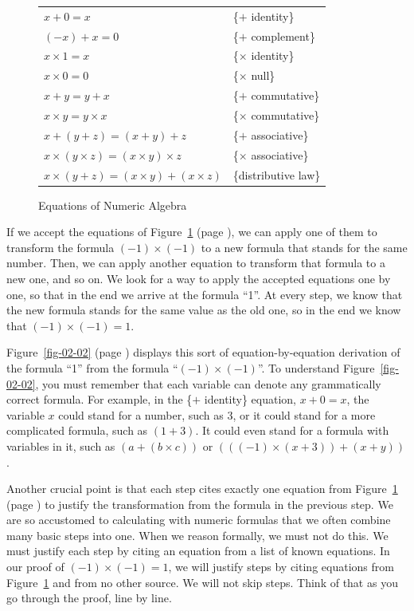 \begin{figure}
\begin{center}
\begin{tabular}{ll}
$x+0 = x$                 & \{$+$ identity\} \\
$(-x)+ x = 0$             & \{$+$ complement\} \\
$x \times 1 = x$          & \{$\times$ identity\} \\
$x \times 0 = 0$          & \{$\times$ null\} \\
$x+y = y+x$               & \{$+$ commutative\} \\
$x \times y = y \times x$ & \{$\times$ commutative\} \\
$x+(y+z) = (x+y)+z$       & \{$+$ associative\} \\
$x \times (y \times z) = (x \times y) \times z$ & \{$\times$ associative\} \\
$x\times(y+z) = (x \times y)+(x \times z)$      & \{distributive law\} \\
\end{tabular}
\end{center}
\caption{Equations of Numeric Algebra}
\label{fig-02-01}
\end{figure}

If we accept the equations of Figure~\ref{fig-02-01} (page \pageref{fig-02-01}),
we can apply one of them to transform the formula $(-1)\times(-1)$ to a new formula that
stands for the same number. Then, we can apply another equation to
transform that formula to a new one, and so on. 
We look for a way to apply the
accepted equations one by one, so that in the end we
arrive at the formula ``1''. At every step, we know that the
new formula stands for the same value as the old one, so in
the end we know that $(-1)\times(-1) = 1$.

Figure~\ref{fig-02-02} (page \pageref{fig-02-02})
displays this sort of equation-by-equation derivation of the
formula ``1'' from the formula ``$(-1)\times(-1)$''. To
understand Figure~\ref{fig-02-02}, you must remember that each
variable can denote any
grammatically correct formula. For example, in the
\{$+$ identity\} equation, $x + 0 = x$, the variable $x$ could stand for
a number, such as 3, or it could stand for a more complicated
formula, such as $(1 + 3)$. It could even stand for a formula
with variables in it, such as $(a + (b \times c))$ or
$(((-1) \times (x + 3)) + (x + y))$.

Another crucial point is that each step cites
exactly one equation from Figure~\ref{fig-02-01} (page \pageref{fig-02-01})
to justify the transformation from the formula in the previous step.
We are so accustomed to calculating with numeric formulas that
we often combine many basic steps into one. When we reason formally,
we must not do this. We must justify each step by citing an equation
from a list of known equations. In our proof of $(-1)\times(-1) = 1$,
we will justify steps by citing equations from Figure~\ref{fig-02-01}
and from no other source. We will not skip steps.
Think of that as you go through the proof, line by line.


